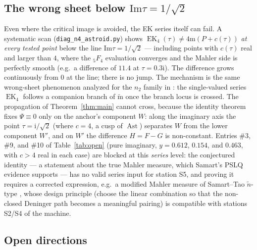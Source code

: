 \documentclass[11pt]{article}
\newcommand{\m}{\mathrm{m}}                 %
\newcommand{\mt}{\widetilde{\mathrm{m}}}    %
\newcommand{\ii}{\mathrm{i}}
\newcommand{\ImT}{\mathrm{Im}}
\DeclareMathOperator{\EK}{EK}
\DeclareMathOperator{\Ast}{Ast}
\theoremstyle{definition}
\theoremstyle{remark}
\begin{document}
\subsection{The wrong sheet below \texorpdfstring{$\ImT\tau=1/\sqrt2$}{Im tau = 1/sqrt2}}

Even where the critical image is avoided, the EK series itself can
fail. A systematic scan (\texttt{diag\_n4\_}\allowbreak\texttt{astroid.py}) shows
$\EK_4(\tau)\neq4\m(P+c(\tau))$ \emph{at every tested point} below
the line $\ImT\tau=1/\sqrt2$ --- including points with $c(\tau)$ real and
larger than $4$, where the ${}_5F_4$ evaluation converges and the
Mahler side is perfectly smooth (e.g.\ a difference of $11.4$ at
$\tau=0.3\ii$). The difference grows continuously from $0$ at the
line; there is no jump. The mechanism is the same wrong-sheet
phenomenon analyzed for the $n_2$ family in \cite[Remark~5.6]{Zf}:
the single-valued series $\EK_4$ follows a companion branch of
$\mt$ once the branch locus is crossed. The propagation of
Theorem~\ref{thm:main} cannot cross, because the identity theorem
fixes $\Psi\equiv0$ only on the anchor's component $W$: along the
imaginary axis the point $\tau=\ii/\sqrt2$ (where $c=4$, a cusp of
$\Ast$) separates $W$ from the lower component $W'$, and on $W'$ the
difference $H=F-G$ is non-constant. Entries \#3, \#9, and \#10 of
Table~\ref{tab:open} (pure imaginary, $y=0.612$, $0.154$, and
$0.463$, with $c>4$ real in each case) are blocked at this
\emph{series} level: the conjectured
identity --- a statement about the true Mahler measure, which
Samart's PSLQ evidence supports --- has no valid series input for
station S5, and proving it requires a corrected expression, e.g.\ a
modified Mahler measure of Samart--Tao $\widetilde n$-type \cite{ST},
whose design principle (choose the linear combination so that the
non-closed Deninger path \cite{De} becomes a meaningful pairing) is
compatible with stations S2/S4 of the machine.

\subsection{Open directions}
\end{document}
